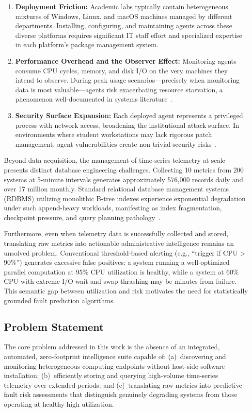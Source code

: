 \documentclass{ieeeaccess}
\begin{document}
\begin{enumerate}
    \item \textbf{Deployment Friction:} Academic labs typically contain heterogeneous mixtures of Windows, Linux, and macOS machines managed by different departments. Installing, configuring, and maintaining agents across these diverse platforms requires significant IT staff effort and specialized expertise in each platform's package management system.
    \item \textbf{Performance Overhead and the Observer Effect:} Monitoring agents consume CPU cycles, memory, and disk I/O on the very machines they intend to observe. During peak usage scenarios---precisely when monitoring data is most valuable---agents risk exacerbating resource starvation, a phenomenon well-documented in systems literature~\cite{agentless_monitoring}.
    \item \textbf{Security Surface Expansion:} Each deployed agent represents a privileged process with network access, broadening the institutional attack surface. In environments where student workstations may lack rigorous patch management, agent vulnerabilities create non-trivial security risks~\cite{network_security}.
\end{enumerate}

Beyond data acquisition, the management of time-series telemetry at scale presents distinct database engineering challenges. Collecting 10 metrics from 200 systems at 5-minute intervals generates approximately 576,000 records daily and over 17 million monthly. Standard relational database management systems (RDBMS) utilizing monolithic B-tree indexes experience exponential degradation under such append-heavy workloads, manifesting as index fragmentation, checkpoint pressure, and query planning pathology~\cite{database_performance}.

Furthermore, even when telemetry data is successfully collected and stored, translating raw metrics into actionable administrative intelligence remains an unsolved problem. Conventional threshold-based alerting (e.g., ``trigger if CPU > 90\%'') generates excessive false positives: a system running a well-optimized parallel computation at 95\% CPU utilization is healthy, while a system at 60\% CPU with extreme I/O wait and swap thrashing may be minutes from failure. This semantic gap between utilization and risk motivates the need for statistically grounded fault prediction algorithms.

\subsection{Problem Statement}
The core problem addressed in this work is the absence of an integrated, automated, zero-footprint intelligence suite capable of: (a)~discovering and monitoring heterogeneous computing endpoints without host-side software installation; (b)~efficiently storing and querying high-volume time-series telemetry over extended periods; and (c)~translating raw metrics into predictive fault risk assessments that distinguish genuinely degrading systems from those operating at healthy high utilization.
\end{document}
